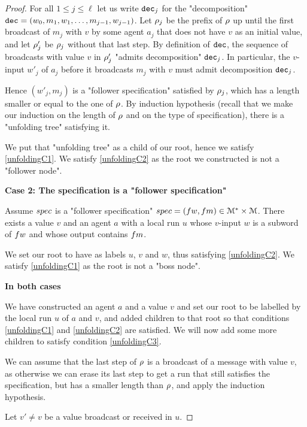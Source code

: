 \begin{proof}
	For all $1 \leq j \leq \ell$ let us write $\mathtt{dec}_j$ for the "decomposition" $\mathtt{dec} = (w_0, m_1, w_1, \ldots, m_{j-1}, w_{j-1})$. Let $\rho_j$ be the prefix of $\rho$ up until the first broadcast of $m_j$ with $v$ by some agent $a_j$ that does not have $v$ as an initial value, and let $\rho'_j$ be $\rho_j$ without that last step. By definition of $\mathtt{dec}$, the sequence of broadcasts with value $v$ in $\rho'_j$ "admits decomposition" $\mathtt{dec}_j$.
	In particular, the $v$-input $w'_j$ of $a_j$ before it broadcasts $m_j$ with $v$ must admit decomposition $\mathtt{dec}_j$.
	
	Hence $(w'_j, m_j)$ is a "follower specification" satisfied by $\rho_j$, which has a length smaller or equal to the one of $\rho$. By induction hypothesis (recall that we make our induction on the length of $\rho$ and on the type of specification), there is a "unfolding tree" satisfying it.
	
	We put that "unfolding tree" as a child of our root, hence we satisfy \ref{unfoldingC1}. We satisfy \ref{unfoldingC2} as the root we constructed is not a "follower node".
	
	\textbf{Case 2: The specification is a "follower specification"} 
	
	Assume $\spec$ is a "follower specification" $\spec = (\followwordspec, \followmessagespec) \in \messages^* \times \messages$. 
	There exists a value $v$ and an agent $a$ with a local run $u$ whose $v$-input $w$ is a subword of $\followwordspec$ and whose output contains $\followmessagespec$. 
	
	We set our root to have as labels $u$, $v$ and $w$, thus satisfying \ref{unfoldingC2}. We satisfy \ref{unfoldingC1} as the root is not a "boss node".
	
	\textbf{In both cases}
	
	We have constructed an agent $a$ and a value $v$ and set our root to be labelled by the local run $u$ of $a$ and $v$, and added children to that root so that conditions \ref{unfoldingC1} and \ref{unfoldingC2} are satisfied. We will now add some more children to satisfy condition \ref{unfoldingC3}.
	
	We can assume that the last step of $\rho$ is a broadcast of a message with value $v$, as otherwise we can erase its last step to get a run that still satisfies the specification, but has a smaller length than $\rho$, and apply the induction hypothesis.
	
	Let $v' \neq v$ be a value broadcast or received in $u$. 
	

\end{proof}
